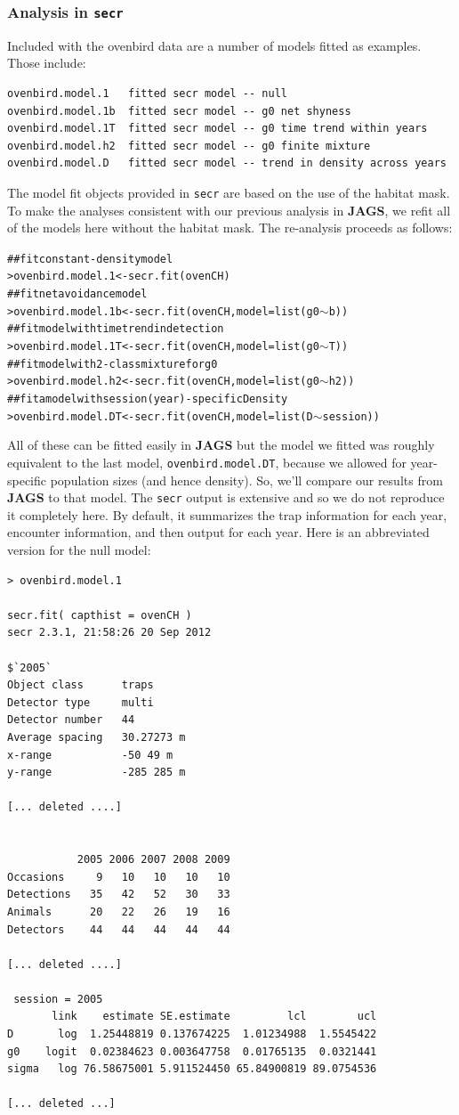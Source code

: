 \subsubsection{Analysis in \mbox{\tt secr} }


Included with the ovenbird data are a number of  models fitted as
examples. Those include:
{\small
\begin{verbatim}
ovenbird.model.1   fitted secr model -- null
ovenbird.model.1b  fitted secr model -- g0 net shyness
ovenbird.model.1T  fitted secr model -- g0 time trend within years
ovenbird.model.h2  fitted secr model -- g0 finite mixture
ovenbird.model.D   fitted secr model -- trend in density across years
\end{verbatim}
}
The model fit objects provided in \mbox{\tt secr} are based on the use
of the habitat mask.
To make the analyses consistent with our previous analysis in {\bf
  JAGS}, we 
refit all of the models here without the habitat mask.
The re-analysis proceeds as follows:
{\small
\begin{alltt}
## fit constant-density model
> ovenbird.model.1 <- secr.fit(ovenCH)
## fit net avoidance model
> ovenbird.model.1b <- secr.fit(ovenCH, model =   list(g0 \(\sim\) b))
## fit model with time trend in detection
> ovenbird.model.1T <- secr.fit(ovenCH, model =    list(g0 \(\sim\) T))
## fit model with 2-class mixture for g0
> ovenbird.model.h2 <- secr.fit(ovenCH, model =    list(g0 \(\sim\) h2))
## fit a model with session (year)-specific Density
> ovenbird.model.DT <- secr.fit(ovenCH, model =    list(D \(\sim\) session))
\end{alltt}
}
All of these can be fitted easily in {\bf JAGS} but
the model we fitted was roughly equivalent to the last model,
\mbox{\tt ovenbird.model.DT}, because we allowed for year-specific
population sizes (and hence density). So, we'll
compare our results from {\bf JAGS} to that
model.
The \mbox{\tt secr} 
output is extensive 
and so we
do not reproduce it completely here. By default, it summarizes the
trap information for each year, encounter information, and then output for
each year. Here is an abbreviated version for the null model:
{\small
\begin{verbatim}
> ovenbird.model.1

secr.fit( capthist = ovenCH )
secr 2.3.1, 21:58:26 20 Sep 2012

$`2005`
Object class      traps
Detector type     multi
Detector number   44
Average spacing   30.27273 m
x-range           -50 49 m
y-range           -285 285 m

[... deleted ....]


           2005 2006 2007 2008 2009
Occasions     9   10   10   10   10
Detections   35   42   52   30   33
Animals      20   22   26   19   16
Detectors    44   44   44   44   44

[... deleted ....]

 session = 2005
       link    estimate SE.estimate         lcl        ucl
D       log  1.25448819 0.137674225  1.01234988  1.5545422
g0    logit  0.02384623 0.003647758  0.01765135  0.0321441
sigma   log 76.58675001 5.911524450 65.84900819 89.0754536

[... deleted ...]
\end{verbatim}
}


